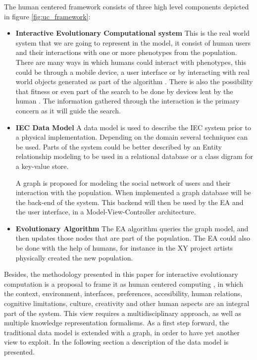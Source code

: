 \documentclass[conference]{IEEEtran}
\begin{document}
The human centered framework consists of three high level components depicted
in figure \ref{fig:uc_framework}:
\begin{itemize}
  \item {\bf Interactive Evolutionary Computational system} 
  This is the real world system that we are going to represent in the model, 
  it consist of human users and their interactions with one or more phenotypes
  from
  the population. There are many ways in which humans could interact 
  with phenotypes, this could be through a mobile device, a user interface 
  or by interacting with real world objects generated as part of the algorithm 
  \cite{de2014artists,de2013unplugging}. 
  There is also the possibility that fitness or even part of the search 
  to be done by devices lent by the human \cite{DBLP:conf/gecco/MereloCGCRV16}.
  The information gathered through the interaction is the primary concern
  as it will guide the search. 

  \item {\bf IEC Data Model}
  A data model is used to describe the IEC system prior to a physical 
  implementation.  Depending on the domain several techniques can be used.
  Parts of the system could be better described by an Entity relationship 
  modeling to be used in a relational database or a class digram for a 
  key-value store. 

  A graph is proposed for modeling the social network of users 
  and their interaction with the population. When implemented a graph database 
  will be the back-end of the system. This  backend will then be
  used by the EA and the user interface, in a Model-View-Controller architecture. 

  \item {\bf Evolutionary Algorithm} 
  The EA algorithm queries the graph model, and then updates those nodes that 
  are part of the population. The EA could also be done with the help of
  humans, for instance in the XY project \cite{de2013unplugging} artists physically created
  the new population.  
\end{itemize}




Besides, the methodology presented in this paper for interactive
evolutionary computation is a proposal to frame it as human centered computing \cite{sebe2010human},
in which the context, environment, interfaces, preferences, accesibility, human relations, cognitive
limitations, culture, creativity and other human aspects are an integral part of the system. 
This view requires a multidisciplinary approach, as well as multiple
knowledge representation formalisms. 
As a first step forward, the traditional data model is extended with a graph, in order to have 
yet another view to exploit. In the following section a description of
the data model is presented. 
\end{document}
